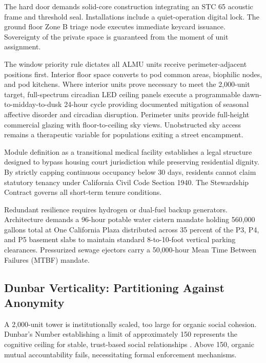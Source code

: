 \documentclass[12pt, letterpaper]{article}
\begin{document}
The hard door demands solid-core construction integrating an STC 65 acoustic frame and threshold seal. Installations include a quiet-operation digital lock. The ground floor Zone B triage node executes immediate keycard issuance. Sovereignty of the private space is guaranteed from the moment of unit assignment.

The window priority rule dictates all ALMU units receive perimeter-adjacent positions first. Interior floor space converts to pod common areas, biophilic nodes, and pod kitchens. Where interior units prove necessary to meet the 2,000-unit target, full-spectrum circadian LED ceiling panels execute a programmable dawn-to-midday-to-dusk 24-hour cycle providing documented mitigation of seasonal affective disorder and circadian disruption. Perimeter units provide full-height commercial glazing with floor-to-ceiling sky views. Unobstructed sky access remains a therapeutic variable for populations exiting a street encampment.

Module definition as a transitional medical facility establishes a legal structure designed to bypass housing court jurisdiction while preserving residential dignity. By strictly capping continuous occupancy below 30 days, residents cannot claim statutory tenancy under California Civil Code Section 1940. The Stewardship Contract governs all short-term tenure conditions.

Redundant resilience requires hydrogen or dual-fuel backup generators. Architecture demands a 96-hour potable water cistern mandate holding 560,000 gallons total at One California Plaza distributed across 35 percent of the P3, P4, and P5 basement slabs to maintain standard 8-to-10-foot vertical parking clearances. Pressurized sewage ejectors carry a 50,000-hour Mean Time Between Failures (MTBF) mandate.


\subsection{Dunbar Verticality: Partitioning Against Anonymity}

A 2,000-unit tower is institutionally scaled, too large for organic social cohesion. Dunbar's Number establishing a limit of approximately 150 represents the cognitive ceiling for stable, trust-based social relationships \citep{dunbar_1992}. Above 150, organic mutual accountability fails, necessitating formal enforcement mechanisms.
\end{document}
